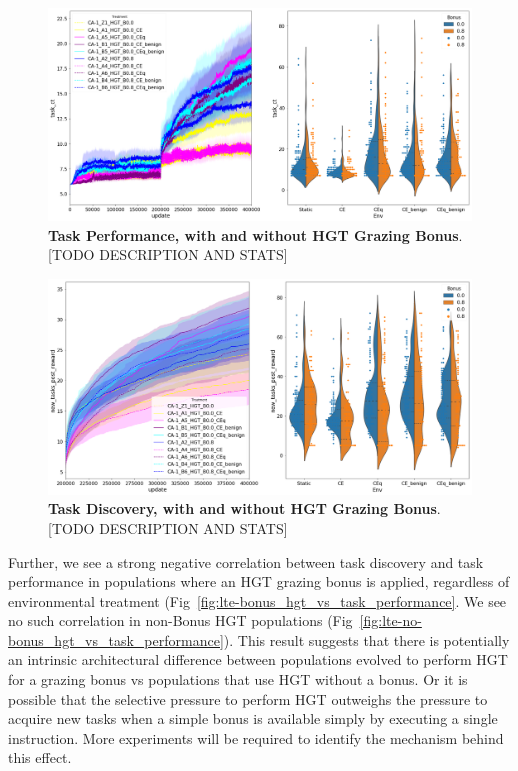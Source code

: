 \documentclass[PhD]{msu-thesis}
\begin{document}
	\begin{figure}[!h]
	\includegraphics[trim={0 0 0 0}, clip, width=0.75\columnwidth]{figures/LTE/lte-hgt-task_performance.png}
	\caption{\textbf{Task Performance, with and without HGT Grazing Bonus}. [TODO DESCRIPTION AND STATS]%
	}
	\label{fig:lte-hgt_task_performance}
	\end{figure}

	\begin{figure}[!h]
	\includegraphics[trim={0 0 0 0}, clip, width=0.75\columnwidth]{figures/LTE/lte-hgt-task_discovery.png}
	\caption{\textbf{Task Discovery, with and without HGT Grazing Bonus}. [TODO DESCRIPTION AND STATS]%
	}
	\label{fig:lte-hgt_task_discovery}
	\end{figure}

Further, we see a strong negative correlation between task discovery and task performance in populations where an HGT grazing bonus is applied, regardless of environmental treatment (Fig~\ref{fig:lte-bonus_hgt_vs_task_performance}. We see no such correlation in non-Bonus HGT populations (Fig~\ref{fig:lte-no-bonus_hgt_vs_task_performance}). This result suggests that there is potentially an intrinsic architectural difference between populations evolved to perform HGT for a grazing bonus vs populations that use HGT without a bonus. Or it is possible that the selective pressure to perform HGT outweighs the pressure to acquire new tasks when a simple bonus is available simply by executing a single instruction.
More experiments will be required to identify the mechanism behind this effect.
\end{document}
